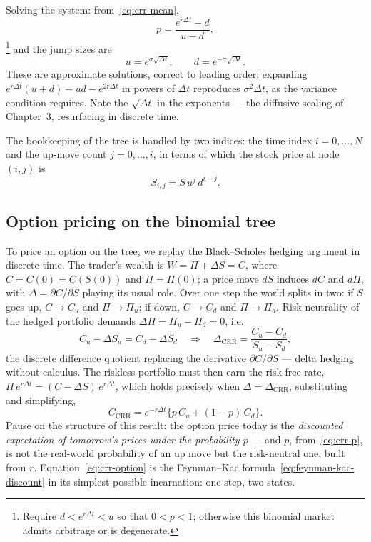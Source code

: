 Solving the system: from~\eqref{eq:crr-mean},
\begin{equation}\label{eq:crr-p}
p = \frac{e^{r\Delta t} - d}{u - d},
\end{equation}\footnote{Require $d<e^{r\Delta t}<u$ so that $0<p<1$; otherwise this binomial market admits arbitrage or is degenerate.}
and the jump sizes are
\begin{equation}\label{eq:crr-ud}
u = e^{\sigma\sqrt{\Delta t}}, \qquad d = e^{-\sigma\sqrt{\Delta t}}.
\end{equation}
These are approximate solutions, correct to leading order: expanding $e^{r\Delta t}(u+d) - ud - e^{2r\Delta t}$ in powers of $\Delta t$ reproduces $\sigma^2\Delta t$, as the variance condition requires.
Note the $\sqrt{\Delta t}$ in the exponents --- the diffusive scaling of Chapter~3, resurfacing in discrete time.

The bookkeeping of the tree is handled by two indices: the time index $i=0,\ldots,N$ and the up-move count $j=0,\ldots,i$, in terms of which the stock price at node $(i,j)$ is
\begin{equation}\label{eq:crr-price}
S_{i,j} = S\, u^j\, d^{i-j}.
\end{equation}

\subsection{Option pricing on the binomial tree}\label{sec:crr-pricing}

To price an option on the tree, we replay the Black--Scholes hedging argument in discrete time.
The trader's wealth is $W = \Pi + \Delta S = C$, where $C=C(0)=C(S(0))$ and $\Pi=\Pi(0)$; a price move $dS$ induces $dC$ and $d\Pi$, with $\Delta = \partial C/\partial S$ playing its usual role.
Over one step the world splits in two: if $S$ goes up, $C\to C_u$ and $\Pi\to\Pi_u$; if down, $C\to C_d$ and $\Pi\to\Pi_d$.
Risk neutrality of the hedged portfolio demands $\Delta\Pi = \Pi_u - \Pi_d = 0$, i.e.
\begin{equation}
C_u - \Delta S_u = C_d - \Delta S_d \quad\Longrightarrow\quad
\Delta_{\text{CRR}} = \frac{C_u - C_d}{S_u - S_d},
\end{equation}
the discrete difference quotient replacing the derivative $\partial C/\partial S$ --- delta hedging without calculus.
The riskless portfolio must then earn the risk-free rate, $\Pi\, e^{r\Delta t} = (C - \Delta S)\, e^{r\Delta t}$, which holds precisely when $\Delta = \Delta_{\text{CRR}}$; substituting and simplifying,
\begin{equation}\label{eq:crr-option}
C_{\text{CRR}} = e^{-r\Delta t}\bigl\{p\, C_u + (1-p)\, C_d\bigr\}.
\end{equation}
Pause on the structure of this result: the option price today is the \emph{discounted expectation of tomorrow's prices under the probability $p$} --- and $p$, from~\eqref{eq:crr-p}, is not the real-world probability of an up move but the risk-neutral one, built from $r$.
Equation~\eqref{eq:crr-option} is the Feynman--Kac formula~\eqref{eq:feynman-kac-discount} in its simplest possible incarnation: one step, two states.

